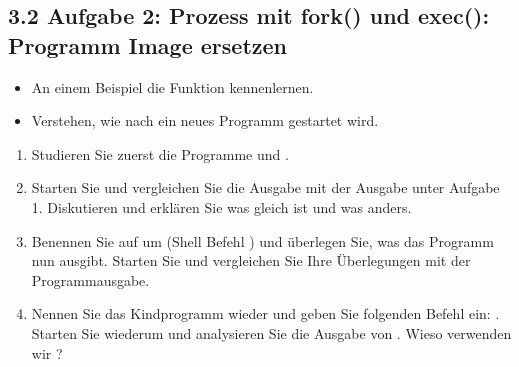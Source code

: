 \documentclass[a4paper,10pt,english]{report}
\begin{document}
\subsection{3.2 Aufgabe 2: Prozess mit fork() und exec(): Programm Image ersetzen}
\label{\detokenize{P07_Prozesse_und_Threads/README:aufgabe-2-prozess-mit-fork-und-exec-programm-image-ersetzen}}
\sphinxAtStartPar
{}
\begin{itemize}
\item {} 
\sphinxAtStartPar
An einem Beispiel die Funktion  kennenlernen.

\item {} 
\sphinxAtStartPar
Verstehen, wie nach  ein neues Programm gestartet wird.

\end{itemize}
\begin{enumerate}
%
\item {} 
\sphinxAtStartPar
Studieren Sie zuerst die Programme  und .

\item {} 
\sphinxAtStartPar
Starten Sie  und vergleichen Sie die Ausgabe mit der Ausgabe unter Aufgabe 1. Diskutieren und erklären Sie was gleich ist und was anders.

\begin{sphinxVerbatim}[commandchars=\\\{\}]

\end{sphinxVerbatim}

\item {} 
\sphinxAtStartPar
Benennen Sie  auf  um (Shell Befehl ) und überlegen Sie, was das Programm nun ausgibt. Starten Sie  und vergleichen Sie Ihre Überlegungen mit der Programmausgabe.

\begin{sphinxVerbatim}[commandchars=\\\{\}]

\end{sphinxVerbatim}

\item {} 
\sphinxAtStartPar
Nennen Sie das Kindprogramm wieder  und geben Sie folgenden Befehl ein: . Starten Sie wiederum  und analysieren Sie die Ausgabe von . Wieso verwenden wir ?

\begin{sphinxVerbatim}[commandchars=\\\{\}]

\end{sphinxVerbatim}

\end{enumerate}
\end{document}
